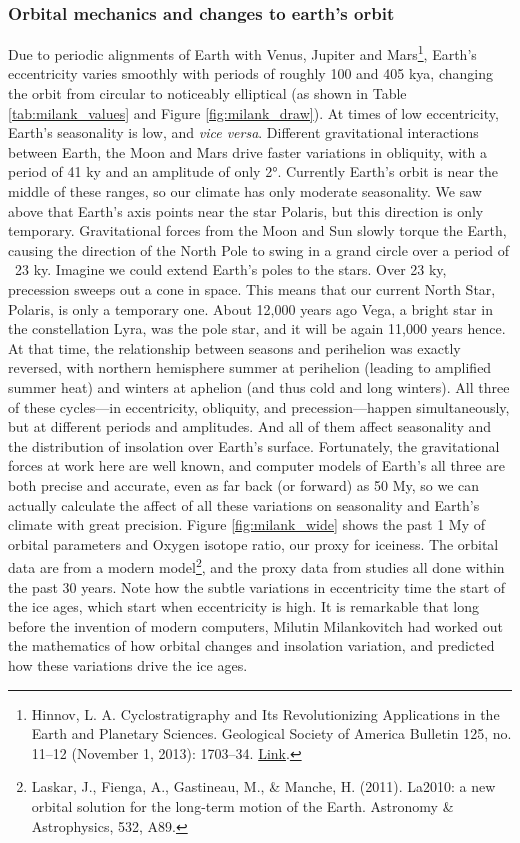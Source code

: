 \documentclass[amstex,12pt]{book}
\begin{document}
\subsubsection{Orbital mechanics and changes to earth's orbit}
Due to periodic alignments of Earth with Venus, Jupiter and Mars\footnote{Hinnov, L. A. Cyclostratigraphy and Its Revolutionizing Applications in the Earth and Planetary Sciences. Geological Society of America Bulletin 125, no. 11–12 (November 1, 2013): 1703–34. \href{https://doi.org/10.1130/B30934.1}{Link}.}, Earth's eccentricity varies smoothly with periods of roughly 100 and 405 kya, changing the orbit from circular to noticeably elliptical (as shown in Table \ref{tab:milank_values} and Figure \ref{fig:milank_draw}). At times of low eccentricity, Earth's seasonality is low, and \textit{vice versa}. Different gravitational interactions between Earth, the Moon and Mars drive faster variations in obliquity, with a period of 41 ky and an amplitude of only \ang{2}. Currently Earth's orbit is near the middle of these ranges, so our climate has only moderate seasonality. We saw above that Earth's axis points near the star Polaris, but this direction is only temporary. Gravitational forces from the Moon and Sun slowly torque the Earth, causing the direction of the North Pole to swing in a grand circle over a period of ~23 ky. Imagine we could extend Earth's poles to the stars. Over 23 ky, precession sweeps out a cone in space. This means that our current North Star, Polaris, is only a temporary one. About 12,000 years ago Vega, a bright star in the constellation Lyra, was the pole star, and it will be again 11,000 years hence. At that time, the relationship between seasons and perihelion was exactly reversed, with northern hemisphere summer at perihelion (leading to amplified summer heat) and winters at aphelion (and thus cold and long winters). All three of these cycles---in eccentricity, obliquity, and precession---happen simultaneously, but at different periods and amplitudes. And all of them affect seasonality and the distribution of insolation over Earth's surface. Fortunately, the gravitational forces at work here are well known, and computer models of Earth's all three are both precise and accurate, even as far back (or forward) as 50 My, so we can actually calculate the affect of all these variations on seasonality and Earth's climate with great precision. Figure \ref{fig:milank_wide} shows the past 1 My of orbital parameters and Oxygen isotope ratio, our proxy for iceiness. The orbital data are from a modern model\footnote{Laskar, J., Fienga, A., Gastineau, M., \& Manche, H. (2011). La2010: a new orbital solution for the long-term motion of the Earth. Astronomy \& Astrophysics, 532, A89.}, and the proxy data from studies all done within the past 30 years. Note how the subtle variations in eccentricity time the start of the ice ages, which start when eccentricity is high. It is remarkable that long before the invention of modern computers, Milutin Milankovitch had worked out the mathematics of how orbital changes and insolation variation, and predicted how these variations drive the ice ages.\\
\end{document}
